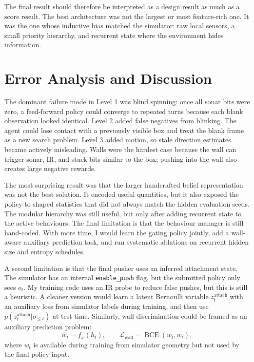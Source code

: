 \documentclass[11pt, oneside]{article}
\begin{document}
The final result should therefore be interpreted as a design result as much as a score result. The best architecture was not the largest or most feature-rich one. It was the one whose inductive bias matched the simulator: raw local sensors, a small priority hierarchy, and recurrent state where the environment hides information.

\section{Error Analysis and Discussion}
The dominant failure mode in Level 1 was blind spinning: once all sonar bits were zero, a feed-forward policy could converge to repeated turns because each blank observation looked identical. Level 2 added false negatives from blinking. The agent could lose contact with a previously visible box and treat the blank frame as a new search problem. Level 3 added motion, so stale direction estimates became actively misleading. Walls were the hardest case because the wall can trigger sonar, IR, and stuck bits similar to the box; pushing into the wall also creates large negative rewards.

The most surprising result was that the larger handcrafted belief representation was not the best solution. It encoded useful quantities, but it also exposed the policy to shaped statistics that did not always match the hidden evaluation seeds. The modular hierarchy was still useful, but only after adding recurrent state to the active behaviours. The final limitation is that the behaviour manager is still hand-coded. With more time, I would learn the gating policy jointly, add a wall-aware auxiliary prediction task, and run systematic ablations on recurrent hidden size and entropy schedules.

A second limitation is that the final pusher uses an inferred attachment state. The simulator has an internal \texttt{enable\_push} flag, but the submitted policy only sees \(o_t\). My training code uses an IR probe to reduce false pushes, but this is still a heuristic. A cleaner version would learn a latent Bernoulli variable \(z_t^{\mathrm{attach}}\) with an auxiliary loss from simulator labels during training, and then use \(p(z_t^{\mathrm{attach}}|o_{\le t})\) at test time. Similarly, wall discrimination could be framed as an auxiliary prediction problem:
\[
\hat{w}_t = f_\psi(h_t),\qquad
\mathcal{L}_{\mathrm{wall}}=\operatorname{BCE}(\hat{w}_t,w_t),
\]
where \(w_t\) is available during training from simulator geometry but not used by the final policy input.
\end{document}
